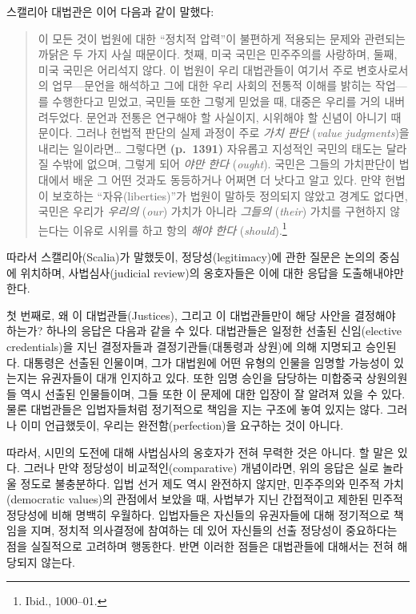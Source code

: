\documentclass[a4paper,12pt,oneside]{article}  %
\newcommand{\emphksans}[1]{%
  {\kopubhangul\kopublatin\textsl{#1}}%
}
\begin{document}
스캘리아 대법관은 이어 다음과 같이 말했다:

\begin{quote}
이 모든 것이 법원에 대한 ``정치적 압력''이 불편하게 적용되는 문제와
관련되는 까닭은 두 가지 사실 때문이다. 첫째, 미국 국민은 민주주의를
사랑하며, 둘째, 미국 국민은 어리석지 않다. 이 법원이 우리 대법관들이
여기서 주로 변호사로서의 업무---문언을 해석하고 그에 대한 우리 사회의
전통적 이해를 밝히는 작업---를 수행한다고 믿었고, 국민들 또한 그렇게
믿었을 때, 대중은 우리를 거의 내버려두었다. 문언과 전통은 연구해야 할
사실이지, 시위해야 할 신념이 아니기 때문이다. 그러나 헌법적 판단의 실제
과정이 주로 \emphksans{가치 판단}(\emph{value judgments})을 내리는 일이라면\ldots{}
그렇다면 \textbf{(p.~1391)} 자유롭고 지성적인 국민의 태도는 달라질
수밖에 없으며, 그렇게 되어\emphksans{야만 한다}(\emph{ought}). 국민은 그들의
가치판단이 법대에서 배운 그 어떤 것과도 동등하거나 어쩌면 더 낫다고 알고
있다. 만약 헌법이 보호하는 ``자유(liberties)''가 법원이 말하듯 정의되지
않았고 경계도 없다면, 국민은 우리가 \emphksans{우리의}(\emph{our}) 가치가 아니라
\emphksans{그들의}(\emph{their}) 가치를 구현하지 않는다는 이유로 시위를 하고
항의\emphksans{해야 한다}(\emph{should}).\footnote{Ibid., 1000--01.}
\end{quote}

따라서 스캘리아(Scalia)가 말했듯이, 정당성(legitimacy)에 관한 질문은
논의의 중심에 위치하며, 사법심사(judicial review)의 옹호자들은 이에 대한
응답을 도출해내야만 한다.

첫 번째로, 왜 이 대법관들(Justices), 그리고 이 대법관들만이 해당 사안을
결정해야 하는가? 하나의 응답은 다음과 같을 수 있다. 대법관들은 일정한
선출된 신임(elective credentials)을 지닌 결정자들과 결정기관들(대통령과
상원)에 의해 지명되고 승인된다. 대통령은 선출된 인물이며, 그가 대법원에
어떤 유형의 인물을 임명할 가능성이 있는지는 유권자들이 대개 인지하고
있다. 또한 임명 승인을 담당하는 미합중국 상원의원들 역시 선출된
인물들이며, 그들 또한 이 문제에 대한 입장이 잘 알려져 있을 수 있다. 물론
대법관들은 입법자들처럼 정기적으로 책임을 지는 구조에 놓여 있지는 않다.
그러나 이미 언급했듯이, 우리는 완전함(perfection)을 요구하는 것이
아니다.

따라서, 시민의 도전에 대해 사법심사의 옹호자가 전혀 무력한 것은 아니다.
할 말은 있다. 그러나 만약 정당성이 비교적인(comparative) 개념이라면,
위의 응답은 실로 놀라울 정도로 불충분하다. 입법 선거 제도 역시 완전하지
않지만, 민주주의와 민주적 가치(democratic values)의 관점에서 보았을 때,
사법부가 지닌 간접적이고 제한된 민주적 정당성에 비해 명백히 우월하다.
입법자들은 자신들의 유권자들에 대해 정기적으로 책임을 지며, 정치적
의사결정에 참여하는 데 있어 자신들의 선출 정당성이 중요하다는 점을
실질적으로 고려하며 행동한다. 반면 이러한 점들은 대법관들에 대해서는
전혀 해당되지 않는다.
\end{document}
